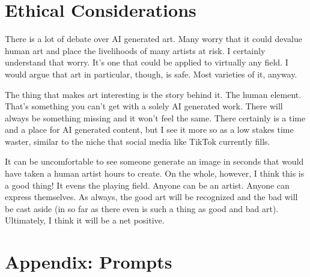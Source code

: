 \documentclass[11pt]{article}
\begin{document}
\section{Ethical Considerations}

There is a lot of debate over AI generated art. Many worry that it could devalue human art and place the livelihoods of many artists at risk. I certainly understand that worry. It's one that could be applied to virtually any field. I would argue that art in particular, though, is safe. Most varieties of it, anyway. 

The thing that makes art interesting is the story behind it. The human element. That's something you can't get with a solely AI generated work. There will always be something missing and it won't feel the same. There certainly is a time and a place for AI generated content, but I see it more so as a low stakes time waster, similar to the niche that social media like TikTok currently fills.

It can be uncomfortable to see someone generate an image in seconds that would have taken a human artist hours to create. On the whole, however, I think this is a good thing! It evens the playing field. Anyone can be an artist. Anyone can express themselves. As always, the good art will be recognized and the bad will be cast aside (in so far as there even is such a thing as good and bad art). Ultimately, I think it will be a net positive.



\clearpage

\appendix

\section{Appendix: Prompts}
\end{document}
